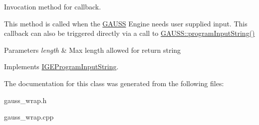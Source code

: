 Invocation method for callback. 

This method is called when the \hyperlink{class_g_a_u_s_s}{G\-A\-U\-S\-S} Engine needs user supplied input. This callback can also be triggered directly via a call to \hyperlink{class_g_a_u_s_s_a7e1284a1d44e68aadb6c70e4416abb7b}{G\-A\-U\-S\-S\-::program\-Input\-String()}


\begin{DoxyParams}{Parameters}
{\em length} & Max length allowed for return string \\
\hline
\end{DoxyParams}


Implements \hyperlink{class_i_g_e_program_input_string_aff170652d98f6a992a27134a7c674e01}{I\-G\-E\-Program\-Input\-String}.



The documentation for this class was generated from the following files\-:\begin{DoxyCompactItemize}
\item 
gauss\-\_\-wrap.\-h\item 
gauss\-\_\-wrap.\-cpp\end{DoxyCompactItemize}
